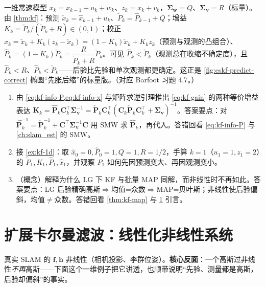 \begin{example}[一维定位的两步 KF 手算]\label{ex:kf-1d}
一维常速模型 $x_k=x_{k-1}+u_k+w_k$、$z_k=x_k+v_k$，$\boldsymbol{\Sigma}_{\mathbf{w}}=Q$、$\boldsymbol{\Sigma}_{\mathbf{v}}=R$（标量）。由 \cref{thm:kf}：预测 $\check{x}_k=\hat{x}_{k-1}+u_k$、$\check{P}_k=\hat{P}_{k-1}+Q$；增益 $K_k=\check{P}_k/(\check{P}_k+R)\in(0,1)$；校正 $\hat{x}_k=\check{x}_k+K_k(z_k-\check{x}_k)=(1-K_k)\check{x}_k+K_k z_k$（预测与观测的凸组合）、$\hat{P}_k=(1-K_k)\check{P}_k=\dfrac{R}{\check{P}_k+R}\check{P}_k$。可见 $\hat{P}_k<\check{P}_k$（观测总在收缩不确定度），且 $\hat{P}_k<R$、$\hat{P}_k<\check{P}_k$——后验比先验和单次观测都更确定。这正是 \cref{fig:eskf-predict-correct} 椭圆“先胀后缩”的标量版。（对应 Barfoot 习题 4.7。）
\end{example}

\begin{practice}
\begin{enumerate}
  \item 由 \cref{eq:kf-info-P,eq:kf-info-x} 与矩阵求逆引理推出 \cref{eq:kf-gain} 的两种等价增益表达 $\mathbf{K}_k=\hat{\mathbf{P}}_k\mathbf{C}_k^\top\boldsymbol{\Sigma}_{\mathbf{v}}^{-1}=\check{\mathbf{P}}_k\mathbf{C}_k^\top(\mathbf{C}_k\check{\mathbf{P}}_k\mathbf{C}_k^\top+\boldsymbol{\Sigma}_{\mathbf{v}})^{-1}$。答案要点：对 $\hat{\mathbf{P}}_k^{-1}=\check{\mathbf{P}}_k^{-1}+\mathbf{C}^\top\boldsymbol{\Sigma}_{\mathbf{v}}^{-1}\mathbf{C}$ 用 SMW 求 $\hat{\mathbf{P}}_k$，再代入。答错回看 \cref{eq:kf-info-P} 与 \cref{ch:slam_est} 的 SMW。
  \item 接 \cref{ex:kf-1d}：取 $\hat{x}_0=0,\hat{P}_0=1,Q=1,R=1/2$，手算 $k=1$（$u_1=1,z_1=2$）的 $\check{P}_1,K_1,\hat{P}_1,\hat{x}_1$，并观察 $\hat{P}_1$ 如何先因预测变大、再因观测变小。
  \item （概念）解释为什么 LG 下 KF 与批量 MAP 同解，而非线性时不再如此。答案要点：LG 后验精确高斯$\Rightarrow$均值=众数$\Rightarrow$MAP=贝叶斯；非线性使后验偏斜，均值$\ne$众数。答错回看 \cref{thm:kf-map} 与 \cref{sec:ekf} 引言。
\end{enumerate}
\end{practice}

\section{扩展卡尔曼滤波：线性化非线性系统}
\label{sec:ekf}

真实 SLAM 的 $\mathbf{f},\mathbf{h}$ 非线性（相机投影、李群位姿）。\textbf{核心反面}：一个高斯过非线性\emph{不再}高斯——下面这个一维例子把它讲透，也顺带说明“先验、测量都是高斯，后验却偏斜”的事实。

